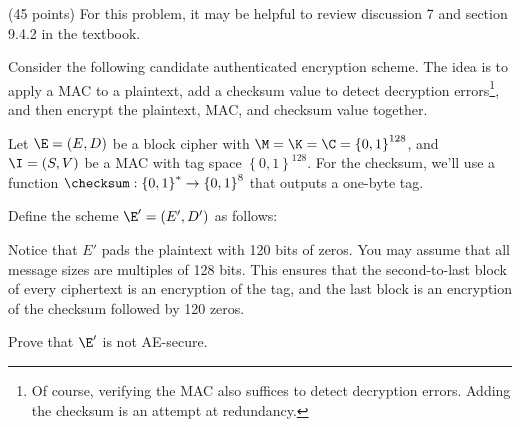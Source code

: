 \documentclass[12pt]{article}
\begin{document}
\begin{problem} (45 points)
For this problem, it may be helpful to review discussion 7 and section 9.4.2 in the textbook.

    Consider the following candidate authenticated encryption scheme. The idea is to apply a MAC to a plaintext, add a checksum value to detect decryption errors\footnote{Of course, verifying the MAC also suffices to detect decryption errors. Adding the checksum is an attempt at redundancy.}, and then encrypt the plaintext, MAC, and checksum value together.

    Let $\E=(E,D)$ be a block cipher with  $\M = \K = \C = \left\{0,1 \right\}^{128}$, and $\I=(S,V)$ be a MAC with tag space $\left\{0,1 \right\}^{128}$. For the checksum, we'll use a function $\checksum : \left\{0,1 \right\}^* \to \left\{0,1 \right\}^{8}$ that outputs a one-byte tag. 

    Define the scheme $\E'  = (E',D')$ as follows:

    \begin{figure}[h!]
        \center
        \begin{subfigure}{0.45\linewidth}
        \end{subfigure}
        \begin{subfigure}{0.45\linewidth}
        \end{subfigure}
    \end{figure}

Notice that $E'$ pads the plaintext with 120 bits of zeros. You may assume that all message sizes are multiples of 128 bits. This ensures that the second-to-last block of every ciphertext is an encryption of the tag, and the last block is an encryption of the checksum followed by 120 zeros.

Prove that $\E'$ is not AE-secure.
\end{problem}
\end{document}
